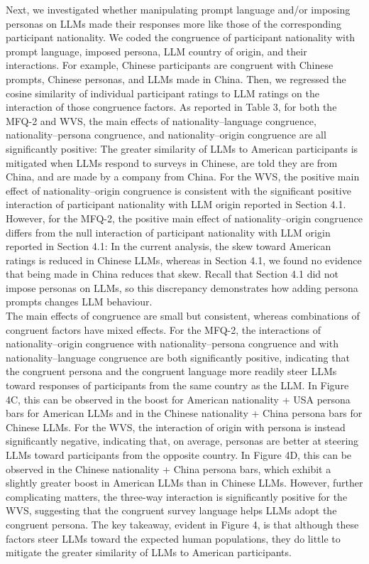 \documentclass[11pt,a4paper]{article}
\begin{document}
Next, we investigated whether manipulating prompt language and/or imposing personas on LLMs made their responses more like those of the corresponding participant nationality. We coded the congruence of participant nationality with prompt language, imposed persona, LLM country of origin, and their interactions. For example, Chinese participants are congruent with Chinese prompts, Chinese personas, and LLMs made in China. Then, we regressed the cosine similarity of individual participant ratings to LLM ratings on the interaction of those congruence factors. As reported in Table 3, for both the MFQ-2 and WVS, the main effects of nationality–language congruence, nationality–persona congruence, and nationality–origin congruence are all significantly positive: The greater similarity of LLMs to American participants is mitigated when LLMs respond to surveys in Chinese, are told they are from China, and are made by a company from China. For the WVS, the positive main effect of nationality–origin congruence is consistent with the significant positive interaction of participant nationality with LLM origin reported in Section 4.1. However, for the MFQ-2, the positive main effect of nationality–origin congruence differs from the null interaction of participant nationality with LLM origin reported in Section 4.1: In the current analysis, the skew toward American ratings is reduced in Chinese LLMs, whereas in Section 4.1, we found no evidence that being made in China reduces that skew. Recall that Section 4.1 did not impose personas on LLMs, so this discrepancy demonstrates how adding persona prompts changes LLM behaviour.\\
\indent The main effects of congruence are small but consistent, whereas combinations of congruent factors have mixed effects. For the MFQ-2, the interactions of nationality–origin congruence with nationality–persona congruence and with nationality–language congruence are both significantly positive, indicating that the congruent persona and the congruent language more readily steer LLMs toward responses of participants from the same country as the LLM. In Figure 4C, this can be observed in the boost for American nationality + USA persona bars for American LLMs and in the Chinese nationality + China persona bars for Chinese LLMs. For the WVS, the interaction of origin with persona is instead significantly negative, indicating that, on average, personas are better at steering LLMs toward participants from the opposite country. In Figure 4D, this can be observed in the Chinese nationality + China persona bars, which exhibit a slightly greater boost in American LLMs than in Chinese LLMs. However, further complicating matters, the three-way interaction is significantly positive for the WVS, suggesting that the congruent survey language helps LLMs adopt the congruent persona. The key takeaway, evident in Figure 4, is that although these factors steer LLMs toward the expected human populations, they do little to mitigate the greater similarity of LLMs to American participants.
\end{document}
